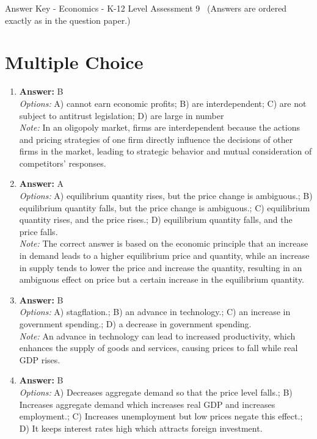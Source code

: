 \documentclass[12pt]{article}
\begin{document}
\begin{center}
Answer Key - Economics - K-12 Level Assessment 9 \
\small (Answers are ordered exactly as in the question paper.)
\end{center}

\section*{Multiple Choice}
\begin{enumerate}[label=\arabic*.]
\item \textbf{Answer:} B
\\ \textit{Options:} A) cannot earn economic profits; B) are interdependent; C) are not subject to antitrust legislation; D) are large in number
\\ \textit{Note:} In an oligopoly market, firms are interdependent because the actions and pricing strategies of one firm directly influence the decisions of other firms in the market, leading to strategic behavior and mutual consideration of competitors' responses.
\item \textbf{Answer:} A
\\ \textit{Options:} A) equilibrium quantity rises, but the price change is ambiguous.; B) equilibrium quantity falls, but the price change is ambiguous.; C) equilibrium quantity rises, and the price rises.; D) equilibrium quantity falls, and the price falls.
\\ \textit{Note:} The correct answer is based on the economic principle that an increase in demand leads to a higher equilibrium price and quantity, while an increase in supply tends to lower the price and increase the quantity, resulting in an ambiguous effect on price but a certain increase in the equilibrium quantity.
\item \textbf{Answer:} B
\\ \textit{Options:} A) stagflation.; B) an advance in technology.; C) an increase in government spending.; D) a decrease in government spending.
\\ \textit{Note:} An advance in technology can lead to increased productivity, which enhances the supply of goods and services, causing prices to fall while real GDP rises.
\item \textbf{Answer:} B
\\ \textit{Options:} A) Decreases aggregate demand so that the price level falls.; B) Increases aggregate demand which increases real GDP and increases employment.; C) Increases unemployment but low prices negate this effect.; D) It keeps interest rates high which attracts foreign investment.

\end{enumerate}
\end{document}
